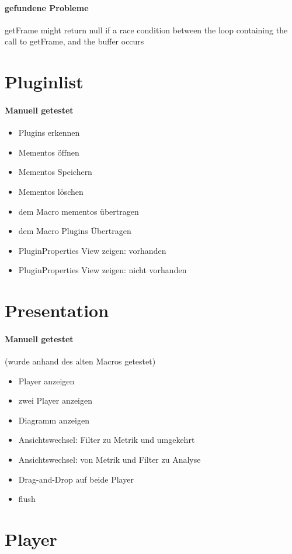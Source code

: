 \paragraph*{gefundene Probleme}
getFrame might return null if a race condition between the loop containing the call to getFrame, and the buffer occurs
\section{Pluginlist}
\paragraph{Manuell getestet}
\begin{itemize}
\item Plugins erkennen
\item Mementos öffnen
\item Mementos Speichern
\item Mementos löschen
\item dem Macro mementos übertragen
\item dem Macro Plugins Übertragen
\item PluginProperties View zeigen: vorhanden
\item PluginProperties View zeigen: nicht vorhanden
\end{itemize}


\section{Presentation}
\paragraph{Manuell getestet}
(wurde anhand des alten Macros getestet)
\begin{itemize}
\item Player anzeigen
\item zwei Player anzeigen
\item Diagramm anzeigen
\item Ansichtswechsel: Filter zu Metrik und umgekehrt
\item Ansichtswechsel: von Metrik und Filter zu Analyse
\item Drag-and-Drop auf beide Player
\item flush
\end{itemize}

\section{Player}
